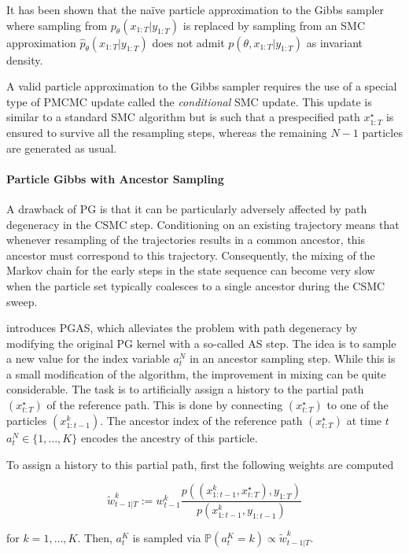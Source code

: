 It has been shown \cite{Andrieu:2010gc} that the naïve particle approximation to the Gibbs sampler where sampling from $p_\theta(x_{1:T}|y_{1:T})$ is replaced by sampling from an SMC approximation $\hat{p}_\theta(x_{1:T}|y_{1:T})$ does not admit $p(\theta, x_{1:T}|y_{1:T})$ as invariant density.

A valid particle approximation to the Gibbs sampler requires the use of a special type of \gls{PMCMC} update called the \textit{conditional} \gls{SMC} update. This update is similar to a standard \gls{SMC} algorithm but is such that a prespecified path $x^\star_{1:T}$ is ensured to survive all the resampling steps, whereas the remaining $N-1$ particles are generated as usual.

\paragraph{Particle Gibbs with Ancestor Sampling}
A drawback of \gls{PG} is that it can be particularly adversely affected by path degeneracy in the \gls{CSMC} step. Conditioning on an existing trajectory means that whenever resampling of the trajectories results in a common ancestor, this ancestor must correspond to this trajectory. Consequently, the mixing of the Markov chain for the early steps in the state sequence can become very slow when the particle set typically coalesces to a single ancestor during the \gls{CSMC} sweep.

\cite{Lindsten:2014uw} introduces \gls{PGAS}, which alleviates the problem with path degeneracy by modifying the original \gls{PG} kernel with a so-called \gls{AS} step.
The idea is to sample a new value for the index variable $a_t^N$ in an ancestor sampling step. While this is a small modification of the algorithm, the improvement in mixing can be quite considerable.
The task is to artificially assign a history to the partial path $(x^\star_{t:T})$ of the reference path.
This is done by connecting $(x^\star_{t:T})$ to one of the particles $(x^k_{1:t-1})$.
The ancestor index of the reference path $(x^\star_{t:T})$ at time $t$ $a^N_t \in \{1,\dots,K \}$ encodes the ancestry of this particle.

To assign a history to this partial path, first the following weights are computed

$$ \tilde{w}^k_{t-1|T} := {w}^k_{t-1} \frac{p((x^k_{1:t-1},x^\star_{t:T}), y_{1:T})}{p(x^k_{1:t-1}, y_{1:t-1    })}  $$

for $k = 1,\dots,K$. Then, $a^K_t$ is sampled via $\mathbb{P}\left( a^K_t = k \right) \propto \tilde{w}^k_{t-1|T}$.


